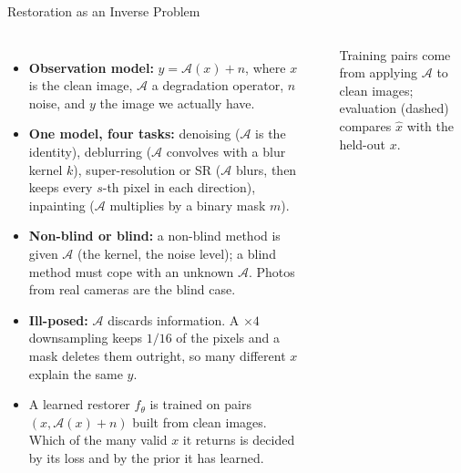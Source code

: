 \begin{frame}{Restoration as an Inverse Problem}
  \begin{columns}[T,onlytextwidth]
      \begin{itemize}\footnotesize\itemsep0.35em
        \item \textbf{Observation model:} $y = \mathcal{A}(x) + n$, where $x$ is the clean image, $\mathcal{A}$ a degradation operator, $n$ noise, and $y$ the image we actually have.
        \item \textbf{One model, four tasks:} denoising ($\mathcal{A}$ is the identity), deblurring ($\mathcal{A}$ convolves with a blur kernel $k$), super-resolution or SR ($\mathcal{A}$ blurs, then keeps every $s$-th pixel in each direction), inpainting ($\mathcal{A}$ multiplies by a binary mask $m$).
        \item \textbf{Non-blind or blind:} a non-blind method is given $\mathcal{A}$ (the kernel, the noise level); a blind method must cope with an unknown $\mathcal{A}$. Photos from real cameras are the blind case.
        \item \textbf{Ill-posed:} $\mathcal{A}$ discards information. A $\times 4$ downsampling keeps $1/16$ of the pixels and a mask deletes them outright, so many different $x$ explain the same $y$.
        \item A learned restorer $f_\theta$ is trained on pairs $(x, \mathcal{A}(x)+n)$ built from clean images. Which of the many valid $x$ it returns is decided by its loss and by the prior it has learned.
      \end{itemize}
      \centering
      \vspace{0.3em}
      \\[0.3em]
      {\scriptsize Training pairs come from applying $\mathcal{A}$ to clean images; evaluation (dashed) compares $\hat{x}$ with the held-out $x$.\par}
  \end{columns}
\end{frame}

